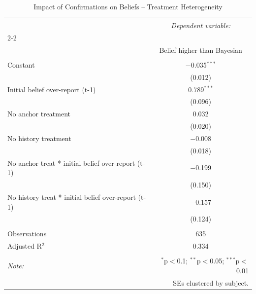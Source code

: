 
\begin{table}[!htbp] \centering 
  \caption{Impact of Confirmations on Beliefs -- Treatment Heterogeneity} 
  \label{} 
\begin{tabular}{@{\extracolsep{5pt}}lc} 
\\[-1.8ex]\hline 
\hline \\[-1.8ex] 
 & \multicolumn{1}{c}{\textit{Dependent variable:}} \\ 
\cline{2-2} 
\\[-1.8ex] & Belief higher than Bayesian \\ 
\hline \\[-1.8ex] 
 Constant & $-$0.035$^{***}$ \\ 
  & (0.012) \\ 
  Initial belief over-report (t-1) & 0.789$^{***}$ \\ 
  & (0.096) \\ 
  No anchor treatment & 0.032 \\ 
  & (0.020) \\ 
  No history treatment & $-$0.008 \\ 
  & (0.018) \\ 
  No anchor treat * initial belief over-report (t-1) & $-$0.199 \\ 
  & (0.150) \\ 
  No history treat * initial belief over-report (t-1) & $-$0.157 \\ 
  & (0.124) \\ 
 \hline \\[-1.8ex] 
Observations & 635 \\ 
Adjusted R$^{2}$ & 0.334 \\ 
\hline 
\hline \\[-1.8ex] 
\textit{Note:}  & \multicolumn{1}{r}{$^{*}$p$<$0.1; $^{**}$p$<$0.05; $^{***}$p$<$0.01} \\ 
 & \multicolumn{1}{r}{SEs clustered by subject.} \\ 
\end{tabular} 
\end{table} 
